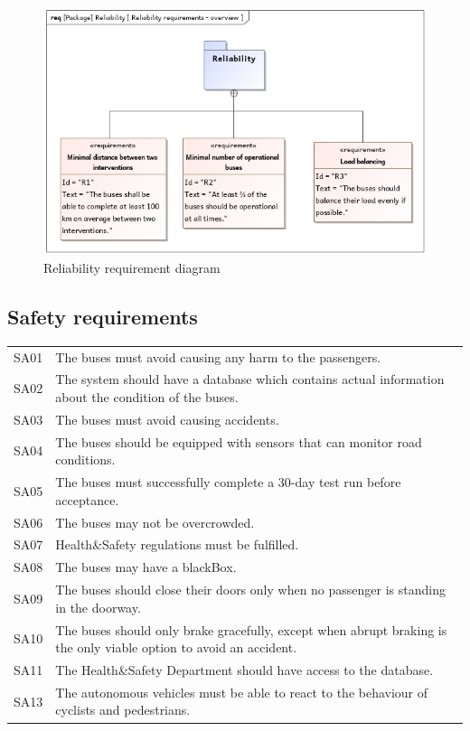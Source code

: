 \documentclass[a4paper]{article}
\begin{document}
\begin{figure}
	\centering
	\includegraphics[width=.75\textwidth]{req-reliability.jpg}
	\caption{Reliability requirement diagram}%
	\label{fig:req-reliability}
\end{figure}

\subsection{Safety requirements}
\begin{tabularx}{\textwidth}{p{.75cm} X}
        SA01 & The buses must avoid causing any harm to the passengers. \\

	SA02 & The system should have a database which contains actual
	       information about the condition of the buses. \\

        SA03 & The buses must avoid causing accidents. \\

	SA04 & The buses should be equipped with \gls{sensor}s that can
	       \gls{monitor} road conditions. \\

	SA05 & The buses must successfully complete a 30-day test run before
	       acceptance. \\

        SA06 & The buses may not be overcrowded. \\

        SA07 & Health\&Safety regulations must be fulfilled. \\

        SA08 & The buses may have a \gls{blackBox}. \\

	SA09 & The buses should close their doors only when no passenger is
	       standing in the doorway. \\

	SA10 & The buses should only brake gracefully, except when abrupt
	       braking is the only viable option to avoid an accident. \\

	SA11 & The Health\&Safety Department should have access to the database.
	       \\

	SA13 & The \gls{autonomous} \gls{vehicle}s must be able to react to the
	       behaviour of cyclists and pedestrians. \\
\end{tabularx}
\end{document}
